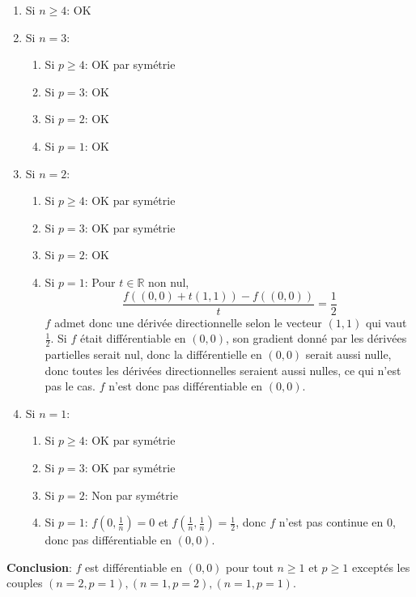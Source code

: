 \documentclass{report}
\begin{document}
\begin{enumerate}
\item Si $n\geq 4$: OK 
\item Si $n=3$: \begin{enumerate}
\item Si $p\geq 4$: OK par symétrie
\item Si $p=3$: OK 
\item Si $p=2$: OK
\item Si $p=1$: OK
\end{enumerate}
\item Si $n=2$: \begin{enumerate}
\item Si $p\geq 4$: OK par symétrie
\item Si $p=3$: OK par symétrie
\item Si $p=2$: OK
\item Si $p=1$: Pour $t\in \mathbb R$ non nul, $$ \frac{f\left((0,0)+t(1,1)\right) - f((0,0))}{t} = \frac 12$$
$f$ admet donc une dérivée directionnelle selon le vecteur $(1,1)$ qui vaut $\frac 12$.\newline
Si $f$ était différentiable en $(0,0)$, son gradient donné par les dérivées partielles serait nul, donc la différentielle en $(0,0)$ serait aussi nulle, donc toutes les dérivées directionnelles seraient aussi nulles, ce qui n'est pas le cas. $f$ n'est donc pas différentiable en $(0,0)$.
\end{enumerate}
\item Si $n=1$: \begin{enumerate}
\item Si $p\geq 4$: OK par symétrie
\item Si $p=3$: OK par symétrie
\item Si $p=2$: Non par symétrie
\item Si $p=1$: $f(0,\frac{1}{n})=0$ et $f(\frac{1}{n},\frac{1}{n})=\frac{1}{2}$, donc $f$ n'est pas continue en $0$, donc pas différentiable en $(0,0)$.
\end{enumerate}
\end{enumerate}
\textbf{Conclusion}: $f$ est différentiable en $(0,0)$ pour tout $n\geq 1$ et $p\geq 1$ exceptés les couples $(n=2,p=1),(n=1,p=2),(n=1,p=1)$.
\end{document}
